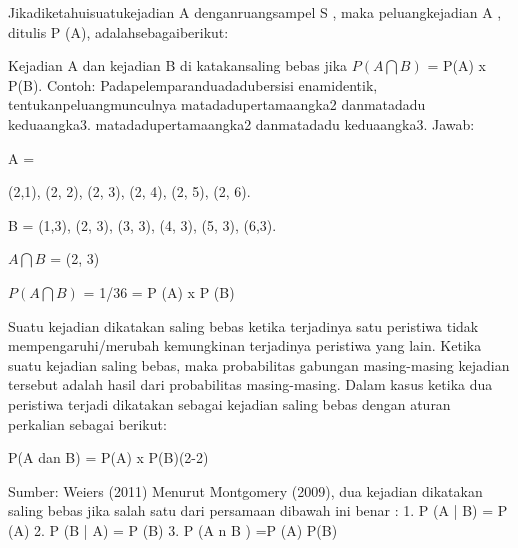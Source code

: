 \documentclass[11pt,fleqn]{book} %
\begin{document}
{\vspace{0.5in}
Jikadiketahuisuatukejadian A denganruangsampel S , maka peluangkejadian A , ditulis P (A), adalahsebagaiberikut:

\vspace{0.5in}
Kejadian A dan kejadian B  di katakansaling bebas 
jika $ P(A \bigcap B) $ = P(A) x P(B). 
Contoh:  Padapelemparanduadadubersisi enamidentik, tentukanpeluangmunculnya matadadupertamaangka2 danmatadadu keduaangka3. matadadupertamaangka2 danmatadadu keduaangka3. 
Jawab:  
\vspace{0.5in}

A = {(2,1), (2, 2), (2, 3), (2, 4), (2, 5), (2, 6). 

\vspace{0.5in}

B = {(1,3), (2, 3), (3, 3), (4, 3), (5, 3), (6,3)}. 
\vspace{0.5in}

$	A \bigcap B $ = {(2, 3)} 

\vspace{0.5in}

$ P(A \bigcap B)$ = 1/36 = P (A) x P (B)

Suatu kejadian dikatakan saling bebas ketika terjadinya satu peristiwa tidak mempengaruhi/merubah kemungkinan terjadinya peristiwa yang lain. Ketika suatu kejadian saling bebas, maka probabilitas gabungan masing-masing kejadian tersebut adalah hasil dari probabilitas masing-masing. Dalam kasus ketika dua peristiwa terjadi dikatakan sebagai kejadian saling bebas dengan aturan perkalian sebagai berikut: 

\vspace{0.5in}

P(A dan B) = P(A) x P(B)(2-2)

\vspace{0.5in}                                                                                                                         

Sumber: Weiers (2011) 
Menurut Montgomery (2009), dua kejadian dikatakan saling bebas jika salah satu dari persamaan dibawah ini benar : 
1. P (A | B) = P (A) 
2. P (B | A) = P (B) 
3. P (A n B ) =P (A) P(B)






}}
\end{document}
